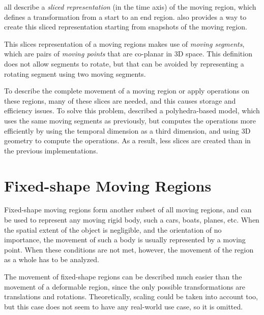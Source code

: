  all describe a \textit{sliced representation} (in the time axis) of the moving region, which defines a transformation from a start to an end region.  also provides a way to create this sliced representation starting from snapshots of the moving region.


This slices representation of a moving regions makes use of \textit{moving segments}, which are pairs of \textit{moving points} that are co-planar in 3D space. This definition does not allow segments to rotate, but that can be avoided by representing a rotating segment using two moving segments.


To describe the complete movement of a moving region or apply operations on these regions, many of these slices are needed, and this causes storage and efficiency issues. To solve this problem,  described a polyhedra-based model, which uses the same moving segments as previously, but computes the operations more efficiently by using the temporal dimension as a third dimension, and using 3D geometry to compute the operations. As a result, less slices are created than in the previous implementations.

\section{Fixed-shape Moving Regions}

Fixed-shape moving regions form another subset of all moving regions, and can be used to represent any moving rigid body, such a cars, boats, planes, etc. When the spatial extent of the object is negligible, and the orientation of no importance, the movement of such a body is usually represented by a moving point. When these conditions are not met, however, the movement of the region as a whole has to be analyzed.

The movement of fixed-shape regions can be described much easier than the movement of a deformable region, since the only possible transformations are translations and rotations. Theoretically, scaling could be taken into account too, but this case does not seem to have any real-world use case, so it is omitted.

